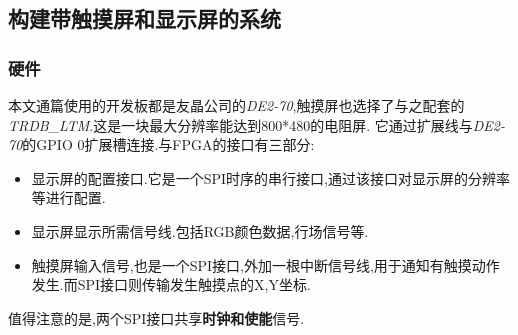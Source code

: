\documentclass[12pt,a4paper,titlepage]{article}
\begin{document}
\subsection{构建带触摸屏和显示屏的系统}
\subsubsection{硬件}
本文通篇使用的开发板都是友晶公司的\textit{DE2-70},触摸屏也选择了与之配套的\textit{TRDB\_LTM}.这是一块最大分辨率能达到800*480的电阻屏.
它通过扩展线与\textit{DE2-70}的GPIO 0扩展槽连接.与FPGA的接口有三部分:
\begin{itemize}
\item 显示屏的配置接口.它是一个SPI时序的串行接口,通过该接口对显示屏的分辨率等进行配置.
\item 显示屏显示所需信号线.包括RGB颜色数据,行场信号等.
\item 触摸屏输入信号,也是一个SPI接口,外加一根中断信号线,用于通知有触摸动作发生.而SPI接口则传输发生触摸点的X,Y坐标.
\end{itemize}
值得注意的是,两个SPI接口共享\textbf{时钟和使能}信号.
\end{document}

